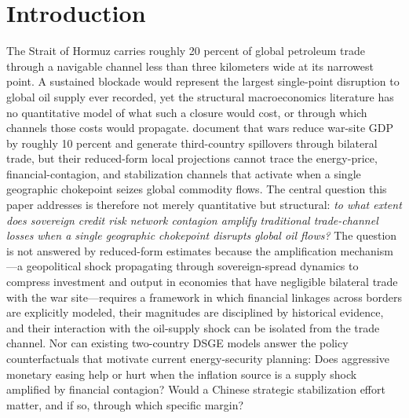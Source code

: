 \documentclass[12pt]{article}
\begin{document}
\section{Introduction}

The Strait of Hormuz carries roughly 20 percent of global petroleum trade through a navigable channel less than three kilometers wide at its narrowest point. A sustained blockade would represent the largest single-point disruption to global oil supply ever recorded, yet the structural macroeconomics literature has no quantitative model of what such a closure would cost, or through which channels those costs would propagate. \citet{federle2026price} document that wars reduce war-site GDP by roughly 10 percent and generate third-country spillovers through bilateral trade, but their reduced-form local projections cannot trace the energy-price, financial-contagion, and stabilization channels that activate when a single geographic chokepoint seizes global commodity flows. The central question this paper addresses is therefore not merely quantitative but structural: \textit{to what extent does sovereign credit risk network contagion amplify traditional trade-channel losses when a single geographic chokepoint disrupts global oil flows?} The question is not answered by reduced-form estimates because the amplification mechanism---a geopolitical shock propagating through sovereign-spread dynamics to compress investment and output in economies that have negligible bilateral trade with the war site---requires a framework in which financial linkages across borders are explicitly modeled, their magnitudes are disciplined by historical evidence, and their interaction with the oil-supply shock can be isolated from the trade channel. Nor can existing two-country DSGE models answer the policy counterfactuals that motivate current energy-security planning: Does aggressive monetary easing help or hurt when the inflation source is a supply shock amplified by financial contagion? Would a Chinese strategic stabilization effort matter, and if so, through which specific margin?
\end{document}
